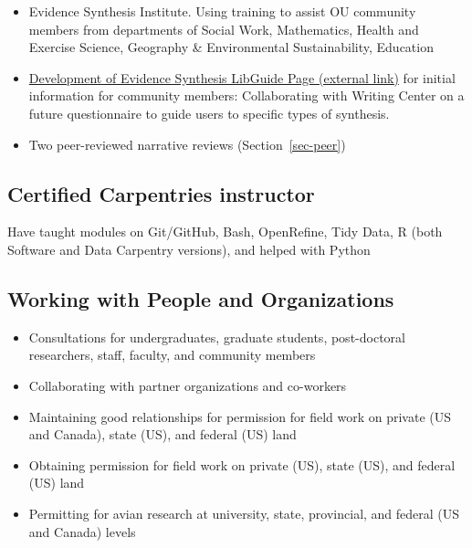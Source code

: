 \documentclass[
  letterpaper,
  DIV=11,
  numbers=noendperiod,
  oneside]{scrreprt}
\providecommand{\tightlist}{%
  \setlength{\itemsep}{0pt}\setlength{\parskip}{0pt}}\usepackage{longtable,booktabs,array}
\begin{document}
\begin{itemize}
\tightlist
\item
  Evidence Synthesis Institute. Using training to assist OU community
  members from departments of Social Work, Mathematics, Health and
  Exercise Science, Geography \& Environmental Sustainability, Education
\end{itemize}


\begin{itemize}
\tightlist
\item
  \href{https://guides.ou.edu/data_resources/synthesis}{Development of
  Evidence Synthesis LibGuide Page (external link)} for initial
  information for community members: Collaborating with Writing Center
  on a future questionnaire to guide users to specific types of
  synthesis.
\item
  Two peer-reviewed narrative reviews (Section~\ref{sec-peer})
\end{itemize}

\subsection{Certified Carpentries
instructor}\label{certified-carpentries-instructor}

Have taught modules on Git/GitHub, Bash, OpenRefine, Tidy Data, R (both
Software and Data Carpentry versions), and helped with Python

\subsection{Working with People and
Organizations}\label{working-with-people-and-organizations}

\begin{itemize}
\tightlist
\item
  Consultations for undergraduates, graduate students, post-doctoral
  researchers, staff, faculty, and community members
\item
  Collaborating with partner organizations and co-workers
\item
  Maintaining good relationships for permission for field work on
  private (US and Canada), state (US), and federal (US) land
\item
  Obtaining permission for field work on private (US), state (US), and
  federal (US) land
\item
  Permitting for avian research at university, state, provincial, and
  federal (US and Canada) levels
\end{itemize}
\end{document}
